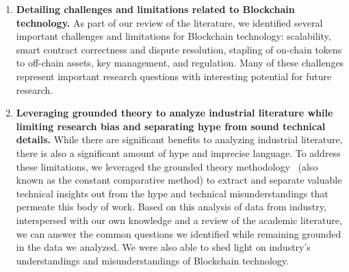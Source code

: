 \begin{enumerate}
	\item \textbf{Detailing challenges and limitations related to Blockchain technology.}
	As part of our review of the literature, we identified several important challenges and limitations for Blockchain technology: scalability, smart contract correctness and dispute resolution, stapling of on-chain tokens to off-chain assets, key management, and regulation.
	Many of these challenges represent important research questions with interesting potential for future research.


	\item \textbf{Leveraging grounded theory to analyze industrial literature while limiting research bias and separating hype from sound technical details.}
	While there are significant benefits to analyzing industrial literature, there is also a significant amount of hype and imprecise language.
	To address these limitations, we leveraged the grounded theory methodology~\cite{glaser1965constant,strauss1990basics,corbin1990grounded} (also known as the constant comparative method) to extract and separate valuable technical insights out from the hype and technical misunderstandings that permeate this body of work.
	Based on this analysis of data from industry, interspersed with our own knowledge and a review of the academic literature, we can answer the common questions we identified while remaining grounded in the data we analyzed.
	We were also able to shed light on industry's understandings and misunderstandings of Blockchain technology. 
	
	
\end{enumerate}
